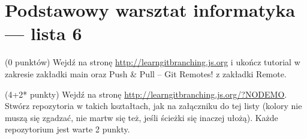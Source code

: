 
 \pagestyle{plain}



\section*{Podstawowy warsztat informatyka --- lista 6}
\begin{zadanie} (0 punktów) 
Wejdź na stronę \url{http://learngitbranching.js.org} i ukończ tutorial w zakresie zakładki main oraz Push \& Pull -- Git Remotes! z zakładki Remote.
\end{zadanie}

\begin{zadanie} (4+2* punkty) 
Wejdź na stronę \url{http://learngitbranching.js.org/?NODEMO}. Stwórz repozytoria w takich kształtach, jak na załączniku do tej listy (kolory nie muszą się zgadzać, nie martw się też, jeśli ścieżki się inaczej ułożą). Każde repozytorium jest warte 2 punkty.
\end{zadanie}

